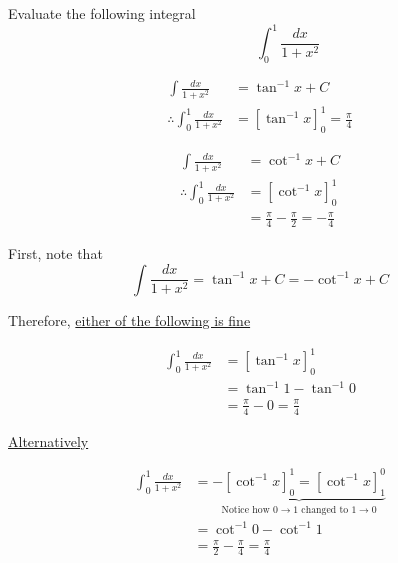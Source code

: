 \documentclass[14pt,fleqn]{extarticle}
\begin{document}
Evaluate the following integral 
\[ \qquad\qquad \int_0^1 \frac{dx}{1+x^2}\] 

\newcard

\begin{align}
\int\frac{dx}{1+x^2} &= \tan^{-1}x + C \\ 
\therefore \int_0^1\frac{dx}{1+x^2} &= \left[ \tan^{-1} x \right]_0^1 = \frac\pi{4} 
\end{align} 

\newcard

\begin{align}
\int\frac{dx}{1+x^2} &= \cot^{-1}x + C \\ 
\therefore \int_0^1\frac{dx}{1+x^2} &= \left[ \cot^{-1} x \right]_0^1 \\
&= \frac\pi{4} - \frac\pi{2} = -\frac\pi{4}
\end{align} 

\newcard 

First, note that 
\[ \int\dfrac{dx}{1+x^2} = \tan^{-1}x + C = -\cot^{-1} x + C \]


Therefore, \underline{either of the following is fine}

%
\begin{align}
\int_0^1\frac{dx}{1+x^2} &= \left[\tan^{-1} x \right]_0^1 \\ 
&= \tan^{-1}1 - \tan^{-1} 0 \\
&= \frac\pi{4} - 0 = \frac\pi{4} 
\end{align}

\underline{Alternatively}

%
\begin{align}
\int_0^1\frac{dx}{1+x^2} &= \underbrace{-\left[\cot^{-1} x \right]_0^1 = \left[\cot^{-1} x \right]_1^0}_{\text{Notice how $0\rightarrow 1$ changed to $1\rightarrow 0$}}\\ 
&= \cot^{-1}0 - \cot^{-1} 1 \\
&= \frac\pi{2} - \frac\pi{4} = \frac\pi{4} 
\end{align}
\end{document}
